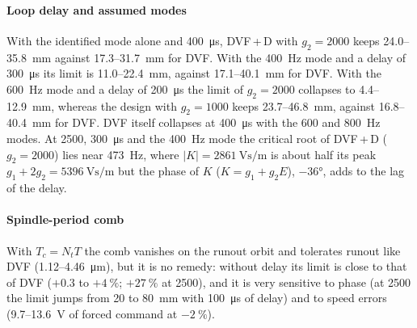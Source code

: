 \paragraph{Loop delay and assumed modes} With the identified mode alone and \SI{400}{\micro\second}, DVF\,+\,D with $g_2=2000$ keeps 24.0--\SI{35.8}{\milli\metre} against 17.3--\SI{31.7}{\milli\metre} for DVF. With the \SI{400}{\hertz} mode and a delay of \SI{300}{\micro\second} its limit is 11.0--\SI{22.4}{\milli\metre}, against 17.1--\SI{40.1}{\milli\metre} for DVF. With the \SI{600}{\hertz} mode and a delay of \SI{200}{\micro\second} the limit of $g_2=2000$ collapses to 4.4--\SI{12.9}{\milli\metre}, whereas the design with $g_2=1000$ keeps 23.7--\SI{46.8}{\milli\metre}, against 16.8--\SI{40.4}{\milli\metre} for DVF. DVF itself collapses at \SI{400}{\micro\second} with the 600 and \SI{800}{\hertz} modes. At \SI{2500}{\rpm}, \SI{300}{\micro\second} and the \SI{400}{\hertz} mode the critical root of DVF\,+\,D ($g_2=2000$) lies near \SI{473}{\hertz}, where $\lvert K\rvert=\SI{2861}{\volt\second\per\metre}$ is about half its peak $g_1+2g_2=\SI{5396}{\volt\second\per\metre}$ but the phase of $K$ ($K=g_1+g_2E$), $-\ang{36}$, adds to the lag of the delay.

\paragraph{Spindle-period comb} With $T_c=N_tT$ the comb vanishes on the runout orbit and tolerates runout like DVF (1.12--\SI{4.46}{\micro\metre}), but it is no remedy: without delay its limit is close to that of DVF ($+0.3$ to $+\SI{4}{\percent}$; $+\SI{27}{\percent}$ at \SI{2500}{\rpm}), and it is very sensitive to phase (at \SI{2500}{\rpm} the limit jumps from 20 to \SI{80}{\milli\metre} with \SI{100}{\micro\second} of delay) and to speed errors (9.7--\SI{13.6}{\volt} of forced command at $-\SI{2}{\percent}$).
